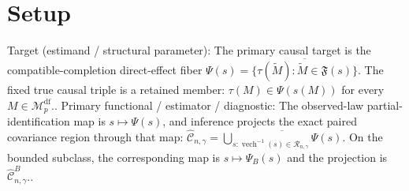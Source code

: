 \documentclass{article}
\begin{document}
\section{Setup}

Target (estimand / structural parameter): The primary causal target is the compatible-completion direct-effect fiber \(\Psi(s)=\overline{\{\tau(\widetilde M):\widetilde M\in\mathfrak F(s)\}}\). The fixed true causal triple is a retained member: \(\tau(M)\in\Psi(s(M))\) for every \(M\in\mathcal M_p^{\mathrm{df}}\)..
Primary functional / estimator / diagnostic: The observed-law partial-identification map is \(s\mapsto\Psi(s)\), and inference projects the exact paired covariance region through that map: \(\widehat{\mathcal C}_{n,\gamma}=\overline{\bigcup_{s:\operatorname{vech}^{-1}(s)\in\mathcal R_{n,\gamma}}\Psi(s)}\). On the bounded subclass, the corresponding map is \(s\mapsto\Psi_B(s)\) and the projection is \(\widehat{\mathcal C}^{B}_{n,\gamma}\)..
\end{document}
